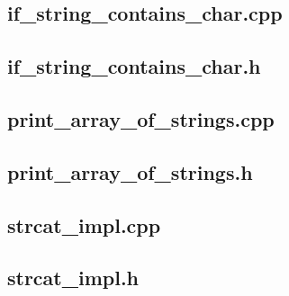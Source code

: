\documentclass[12pt,a4paper]{article}  %
\begin{document}
	\newpage
	\subsection*{if\_string\_contains\_char.cpp}
	
	
	\newpage
	\subsection*{if\_string\_contains\_char.h}
	
	
	\newpage
	\subsection*{print\_array\_of\_strings.cpp}
	
	
	\newpage
	\subsection*{print\_array\_of\_strings.h}
	
	
	\newpage
	\subsection*{strcat\_impl.cpp}
	
	
	\newpage
	\subsection*{strcat\_impl.h}
	
	
\end{document}

